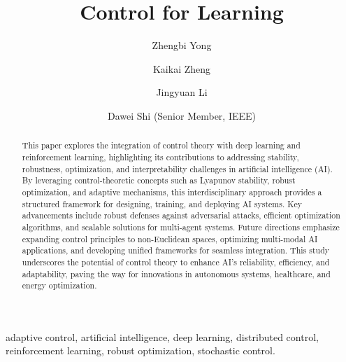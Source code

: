 \documentclass{IEEEojcsys}
\begin{document}

\title{Control for Learning} 


\author{Zhengbi Yong}
\author{Kaikai Zheng}
\author{Jingyuan Li}
\author{Dawei Shi  (Senior Member, IEEE)}




\begin{abstract}
This paper explores the integration of control theory with deep learning and reinforcement learning, highlighting its contributions to addressing stability, robustness, optimization, and interpretability challenges in artificial intelligence (AI). By leveraging control-theoretic concepts such as Lyapunov stability, robust optimization, and adaptive mechanisms, this interdisciplinary approach provides a structured framework for designing, training, and deploying AI systems. Key advancements include robust defenses against adversarial attacks, efficient optimization algorithms, and scalable solutions for multi-agent systems. Future directions emphasize expanding control principles to non-Euclidean spaces, optimizing multi-modal AI applications, and developing unified frameworks for seamless integration. This study underscores the potential of control theory to enhance AI's reliability, efficiency, and adaptability, paving the way for innovations in autonomous systems, healthcare, and energy optimization.
\end{abstract}
    
\begin{IEEEkeywords}
adaptive control, artificial intelligence, deep learning, distributed control, reinforcement learning, robust optimization, stochastic control.
\end{IEEEkeywords}
    

\maketitle
\end{document}
